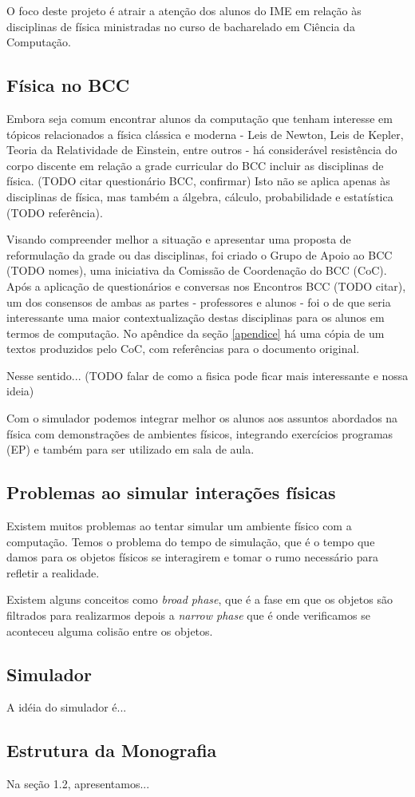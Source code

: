 
O foco deste projeto é atrair a atenção dos alunos do IME em relação às disciplinas de física ministradas no curso de bacharelado em Ciência da Computação.

\subsection{Física no BCC}
Embora seja comum encontrar alunos da computação que tenham interesse em tópicos relacionados a física clássica e moderna - Leis de Newton, Leis de Kepler, Teoria da Relatividade de Einstein, entre outros - há considerável resistência do corpo discente em relação a grade curricular do BCC incluir as disciplinas de física. (TODO citar questionário BCC, confirmar) Isto não se aplica apenas às disciplinas de física, mas também a álgebra, cálculo, probabilidade e estatística (TODO referência).

Visando compreender melhor a situação e apresentar uma proposta de reformulação da grade ou das disciplinas, foi criado o Grupo de Apoio ao BCC (TODO nomes), uma iniciativa da Comissão de Coordenação do BCC (CoC). Após a aplicação de questionários e conversas nos Encontros BCC (TODO citar), um dos consensos de ambas as partes - professores e alunos - foi o de que seria interessante uma maior contextualização destas disciplinas para os alunos em termos de computação. No apêndice da seção \ref{apendice} há uma cópia de um textos produzidos pelo CoC, com referências para o documento original. 

Nesse sentido... (TODO falar de como a fisica pode ficar mais interessante e nossa ideia)

Com o simulador podemos integrar melhor os alunos aos assuntos abordados na física com demonstrações de ambientes físicos, 
integrando exercícios programas (EP) e também para ser utilizado em sala de aula.

\subsection{Problemas ao simular interações físicas}

Existem muitos problemas ao tentar simular um ambiente físico com a computação. Temos o problema do tempo de simulação, 
que é o tempo que damos para os objetos físicos se interagirem e tomar o rumo necessário para refletir a realidade.

Existem alguns conceitos como \textit{broad phase}, que é a fase em que os objetos são filtrados para realizarmos depois a \textit{narrow phase} que é onde verificamos se aconteceu alguma colisão entre os objetos.

\subsection{Simulador}

A idéia do simulador é... 

\subsection{Estrutura da Monografia}

Na seção 1.2, apresentamos...
